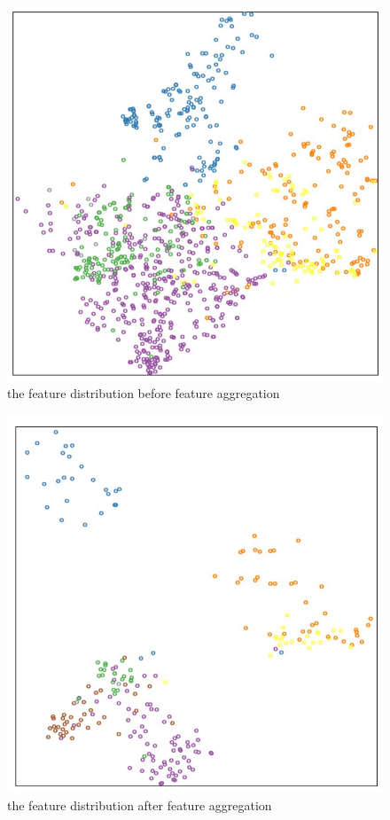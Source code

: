 \documentclass[10pt,twocolumn,letterpaper]{article}
\begin{document}
\begin{figure}[t]
\begin{center}
  \includegraphics[width=0.9\linewidth]{original.JPG}
\end{center}
  \caption{the feature distribution before feature aggregation}
\label{fig:long}
\label{fig:onecol}
\end{figure}


\begin{figure}[t]
\begin{center}
  \includegraphics[width=0.9\linewidth]{agg.JPG}
\end{center}
    \caption{the feature distribution after feature aggregation}
\label{fig:long}
\label{fig:onecol}
\end{figure}
\end{document}

